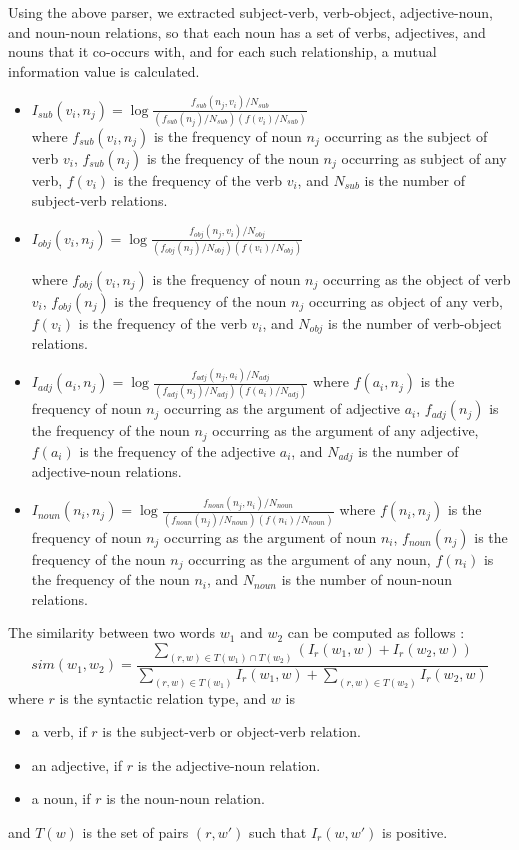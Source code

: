 Using the above parser,  we extracted subject-verb, verb-object, adjective-noun, and noun-noun relations, so that
each noun has a set of verbs, adjectives, and nouns that it co-occurs with, and for each such relationship, a mutual information  value is calculated.


\begin{itemize}
\item $I_{sub}(v_i, n_j) = \log \frac{f_{sub}(n_j,v_i)/N_{sub}}{(f_{sub}(n_j)/N_{sub})(f(v_i)/N_{sub})}$ \\
      where $f_{sub}(v_i,n_j)$ is the frequency of noun $n_j$ occurring as the 
      subject of verb $v_i$, $f_{sub}(n_j)$ is the frequency of the noun $n_j$ occurring as subject of any verb,  $f(v_i)$ is the frequency of the verb $v_i$,
 and $N_{sub}$ is the number of subject-verb relations.

\item $I_{obj}(v_i, n_j) = \log \frac{f_{obj}(n_j,v_i)/N_{obj}}{(f_{obj}(n_j)/N_{obj})(f(v_i)/N_{obj})}$ 

      where $f_{obj}(v_i,n_j)$ is the frequency of noun $n_j$ occurring as the 
      object of       verb $v_i$, $f_{obj}(n_j)$ is the frequency of the noun $n_j$ occurring as object of any verb,  $f(v_i)$ is the frequency of the verb $v_i$,  and $N_{obj}$ is the number of verb-object relations.

\item $I_{adj}(a_i, n_j) = \log \frac{f_{adj}(n_j,a_i)/N_{adj}}{(f_{adj}(n_j)/N_{adj})(f(a_i)/N_{adj})}$ 
      where $f(a_i,n_j)$ is the frequency of noun $n_j$ occurring as the argument of    adjective $a_i$, $f_{adj}(n_j)$ is the frequency of the noun $n_j$ occurring as the argument of any adjective, $f(a_i)$ is the frequency of the adjective $a_i$,  and $N_{adj}$ is the number of adjective-noun relations.

\small
\item $I_{noun}(n_i, n_j) = \log \frac{f_{noun}(n_j,n_i)/N_{noun}}{(f_{noun}(n_j)/N_{noun})(f(n_i)/N_{noun})}$ 
\normalsize
      where $f(n_i,n_j)$ is the frequency of noun $n_j$ occurring as the argument of    noun $n_i$, $f_{noun}(n_j)$ is the frequency of the noun $n_j$ occurring as the argument of any noun, $f(n_i)$ is the frequency of the noun $n_i$,  and $N_{noun}$ is the number of noun-noun relations.

\end{itemize}

The similarity between two words $w_1$ and $w_2$ can be computed as follows :
\[sim(w_1,w_2) = \frac{\displaystyle \sum_{(r,w)\in T(w_1) \cap T(w_2)}(I_r(w_1,w)+I_r(w_2,w))}
{\displaystyle \sum_{(r,w)\in T(w_1)}I_r(w_1,w) + \sum_{(r,w)\in T(w_2)} 
I_r(w_2,w)}\]
where $r$ is the syntactic relation type, and $w$ is
\begin{itemize}
\item a verb, if $r$ is the subject-verb  or object-verb relation.
\item an adjective, if $r$ is the adjective-noun relation.
\item a noun, if $r$ is the noun-noun relation.
\end{itemize}
and $T(w)$ is the set of pairs $(r,w')$ such that $I_r(w,w')$ is positive.  


